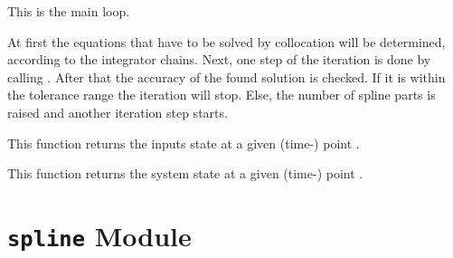 \documentclass[letterpaper,10pt,english]{sphinxmanual}
\begin{document}
\begin{fulllineitems}
\begin{fulllineitems}
\label{pytrajectory:pytrajectory.trajectory.Trajectory.startIteration}
This is the main loop.

At first the equations that have to be solved by collocation will be determined, according
to the integrator chains.
Next, one step of the iteration is done by calling {\hyperref[pytrajectory:pytrajectory.trajectory.Trajectory.iterate]{}}.
After that the accuracy of the found solution is checked.
If it is within the tolerance range the iteration will stop.
Else, the number of spline parts is raised and another iteration step starts.

\end{fulllineitems}


\begin{fulllineitems}
\label{pytrajectory:pytrajectory.trajectory.Trajectory.u}
This function returns the inputs state at a given (time-) point .

\end{fulllineitems}


\begin{fulllineitems}
\label{pytrajectory:pytrajectory.trajectory.Trajectory.x}
This function returns the system state at a given (time-) point .

\end{fulllineitems}


\end{fulllineitems}



\section{\texttt{spline} Module}
\label{pytrajectory:spline-module}\label{pytrajectory:module-pytrajectory.spline}
\end{document}

